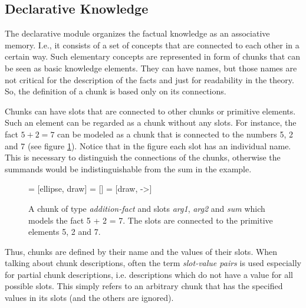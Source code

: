 \subsection{Declarative Knowledge}

The declarative module organizes the factual knowledge as an associative memory. I.e., it consists of a set of concepts that are connected to each other in a certain way. Such elementary concepts are represented in form of chunks that can be seen as basic knowledge elements. They can have names, but those names are not critical for the description of the facts and just for readability in the theory. So, the definition of a chunk is based only on its connections. 

Chunks can have slots that are connected to other chunks or primitive elements. Such an element can be regarded as a chunk without any slots. For instance, the fact $5 + 2 = 7$ can be modeled as a chunk that is connected to the numbers 5, 2 and 7 (see figure \ref{fig:chunk_addition_fact}). Notice that in the figure each slot has an individual name. This is necessary to distinguish the connections of the chunks, otherwise the summands would be indistinguishable from the sum in the example.

\begin{figure}[htb]
\centering
{} = [ellipse, draw]
 = [] 
 = [draw, ->]   

\caption{A chunk of type \emph{addition-fact} and slots \emph{arg1}, \emph{arg2} and \emph{sum} which models the fact 5 + 2 = 7. The slots are connected to the primitive elements 5, 2 and 7.}
\label{fig:chunk_addition_fact}
\end{figure}


Thus, chunks are defined by their name and the values of their slots. When talking about chunk descriptions, often the term \emph{slot-value pairs} is used especially for partial chunk descriptions, i.e. descriptions which do not have a value for all possible slots. This simply refers to an arbitrary chunk that has the specified values in its slots (and the others are ignored).

